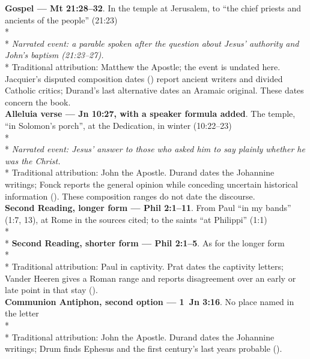 \begin{passagedossiertable}
\midrule
\textbf{Gospel --- Mt 21:28--32}. In the temple at Jerusalem, to ``the chief priests and
ancients of the people'' (21:23)\\*
\\*
\textit{Narrated event: a parable spoken after the question about Jesus'
authority and John's baptism (21:23--27).}\\*
Traditional attribution: Matthew the Apostle; the event is undated here. Jacquier's disputed composition dates () report ancient writers and divided Catholic critics; Durand's last alternative dates an Aramaic original. These dates concern the book.\\
\midrule
\textbf{Alleluia verse --- Jn 10:27, with a speaker formula added}. The temple, ``in
Solomon's porch'', at the Dedication, in winter (10:22--23)\\*
\\*
\textit{Narrated event: Jesus' answer to those who asked him to say
plainly whether he was the Christ.}\\*
Traditional attribution: John the Apostle. Durand dates the Johannine writings; Fonck reports the general opinion while conceding uncertain historical information (). These composition ranges do not date the discourse.\\
\midrule
\textbf{Second Reading, longer form --- Phil 2:1--11}. From Paul ``in my bands''
(1:7, 13), at Rome in the sources cited; to the saints ``at Philippi'' (1:1)\\*
\\*
\textbf{Second Reading, shorter form --- Phil 2:1--5}. As for the longer form\\*
\\*
Traditional attribution: Paul in captivity. Prat dates the captivity letters; Vander Heeren gives a Roman range and reports disagreement over an early or late point in that stay ().\\
\midrule
\textbf{Communion Antiphon, second option --- 1~Jn 3:16}. No place named in the letter\\*
\\*
Traditional attribution: John the Apostle. Durand dates the Johannine writings; Drum finds Ephesus and the first century's last years probable ().\\
\end{passagedossiertable}
